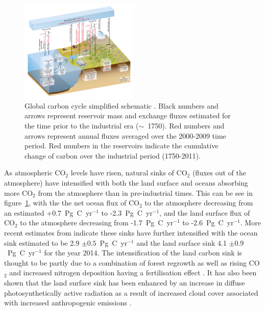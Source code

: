 \documentclass[12pt]{article}
\begin{document}
\begin{figure}[ht]
    \centering
    \includegraphics[width=0.5\textwidth]{ipcc_fig6_1.jpg}
    \caption{Global carbon cycle simplified schematic \citep{ciais2014carbon}. Black numbers and arrows represent reservoir mass and exchange fluxes estimated for the time prior to the industrial era (\(\sim\)~1750). Red numbers and arrows represent annual fluxes averaged over the 2000-2009 time period. Red numbers in the reservoirs indicate the cumulative change of carbon over the industrial period (1750-2011).}
    \label{fig:ipcc_fig6.1}
\end{figure}

As atmospheric CO\(_{2}\) levels have risen, natural sinks of CO\(_{2}\) (fluxes out of the atmosphere) have intensified with both the land surface and oceans absorbing more CO\(_{2}\) from the atmosphere than in pre-industrial times. This can be see in figure~\ref{fig:ipcc_fig6.1}, with the the net ocean flux of CO\(_{2}\) to the atmosphere decreasing from an estimated +0.7~Pg~C~yr\(^{-1}\) to -2.3~Pg~C~yr\(^{-1}\), and the land surface flux of CO\(_{2}\) to the atmosphere decreasing from -1.7~Pg~C~yr\(^{-1}\) to -2.6~Pg~C~yr\(^{-1}\). More recent estimates from \citet{le2015global} indicate these sinks have further intensified with the ocean sink estimated to be 2.9 \(\pm 0.5\)~Pg~C~yr\(^{-1}\) and the land surface sink 4.1 \(\pm 0.9\)~Pg~C~yr\(^{-1}\) for the year 2014. The intensification of the land carbon sink is thought to be partly due to a combination of forest regrowth as well as rising CO\(_{2}\) and increased nitrogen deposition having a fertilisation effect \citep{ciais2014carbon}. It has also been shown that the land surface sink has been enhanced by an increase in diffuse photosynthetically active radiation as a result of increased cloud cover associated with increased anthropogenic emissions \citep{Mercadodiffuseradiation2009}. 
\end{document}
